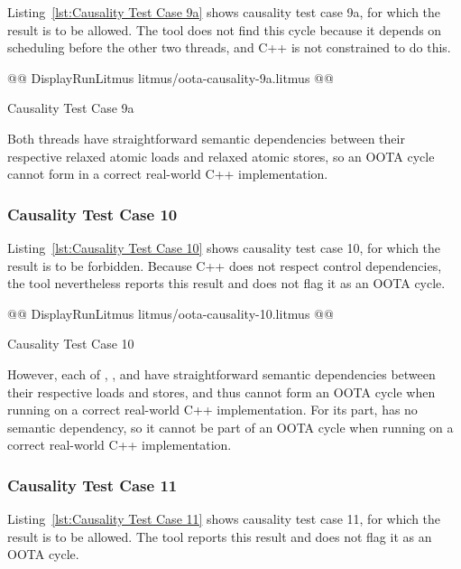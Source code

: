 \documentclass[10]{article}
\begin{document}
Listing~\ref{lst:Causality Test Case 9a}
shows causality test case 9a, for which the 
result is to be allowed.
The  tool does not find this cycle because it depends on
scheduling  before the other two threads, and C++ is not
constrained to do this.

\begin{listing}[tbp]
@@ DisplayRunLitmus litmus/oota-causality-9a.litmus @@
\caption{Causality Test Case 9a}
\label{lst:Causality Test Case 9a}
\end{listing}

Both threads have straightforward semantic dependencies between their
respective relaxed atomic loads and relaxed atomic stores, so an OOTA
cycle cannot form in a correct real-world C++ implementation.

\subsubsection{Causality Test Case 10}
\label{app:Causality Test Case 10}

Listing~\ref{lst:Causality Test Case 10}
shows causality test case 10, for which the 
result is to be forbidden.
Because C++ does not respect control dependencies, the  tool
nevertheless reports this result and does not flag it as an OOTA cycle.

\begin{listing}[tbp]
@@ DisplayRunLitmus litmus/oota-causality-10.litmus @@
\caption{Causality Test Case 10}
\label{lst:Causality Test Case 10}
\end{listing}

However, each of , , and  have straightforward
semantic dependencies between their respective loads and stores, and
thus cannot form an OOTA cycle when running on a correct real-world C++
implementation.
For its part,  has no semantic dependency, so it cannot be part
of an OOTA cycle when running on a correct real-world C++ implementation.

\subsubsection{Causality Test Case 11}
\label{app:Causality Test Case 11}

Listing~\ref{lst:Causality Test Case 11}
shows causality test case 11, for which the 
result is to be allowed.
The  tool reports this result and does not flag it as an OOTA cycle.
\end{document}

